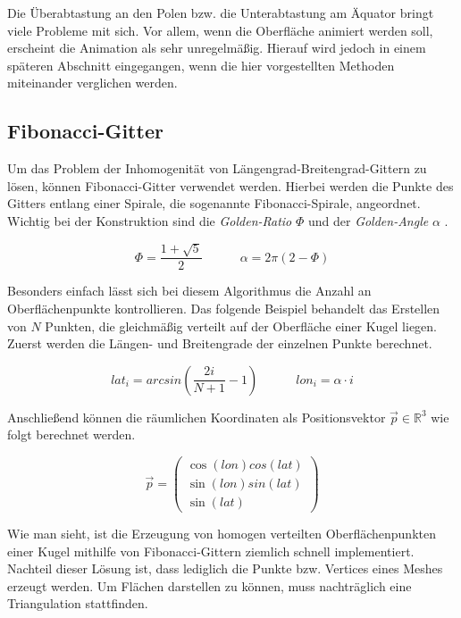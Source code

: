 Die Überabtastung an den Polen bzw. die Unterabtastung am Äquator bringt viele
Probleme mit sich. Vor allem, wenn die Oberfläche animiert werden soll,
erscheint die Animation als sehr unregelmäßig. Hierauf wird jedoch in einem
späteren Abschnitt eingegangen, wenn die hier vorgestellten Methoden miteinander
verglichen werden.

\subsection{Fibonacci-Gitter}
Um das Problem der Inhomogenität von Längengrad-Breitengrad-Gittern zu lösen,
können Fibonacci-Gitter verwendet werden. Hierbei werden die Punkte des Gitters
entlang einer Spirale, die sogenannte Fibonacci-Spirale, angeordnet. Wichtig bei
der Konstruktion sind die \textit{Golden-Ratio} $\Phi$ und der
\textit{Golden-Angle} $\alpha$ \cite{Gonzalez2009, Marques2013}.

$$\Phi = \frac{1 + \sqrt{5}}{2} \quad\quad\quad \alpha = 2\pi\left(2 - \Phi\right)$$

Besonders einfach lässt sich bei diesem Algorithmus die Anzahl an Oberflächenpunkte
kontrollieren. Das folgende Beispiel behandelt das Erstellen von $N$ Punkten,
die gleichmäßig verteilt auf der Oberfläche einer Kugel liegen. Zuerst werden
die Längen- und Breitengrade der einzelnen Punkte berechnet.

$$lat_i = arcsin\left(\frac{2i}{N + 1} - 1\right) \quad\quad\quad
lon_i = \alpha \cdot i$$

Anschließend können die räumlichen Koordinaten als Positionsvektor $\vec{p} \in
\mathbb{R}^3$ wie folgt berechnet werden.

\[
\vec{p} =
\left(\begin{array}{c}
    \cos\left(lon\right) cos\left(lat\right) \\
    \sin\left(lon\right) sin\left(lat\right) \\
    \sin\left(lat\right)
\end{array}\right)
\]

Wie man sieht, ist die Erzeugung von homogen verteilten Oberflächenpunkten einer
Kugel mithilfe von Fibonacci-Gittern ziemlich schnell implementiert. Nachteil
dieser Lösung ist, dass lediglich die Punkte bzw. Vertices eines Meshes erzeugt
werden. Um Flächen darstellen zu können, muss nachträglich eine Triangulation
stattfinden. 

\FloatBarrier
